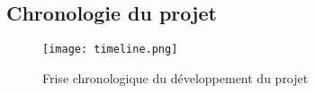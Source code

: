 \subsection{Chronologie du projet}
\begin{figure}[hbt!]
    \centering
    \texttt{[image: timeline.png]}
    \caption{Frise chronologique du développement du projet}

\end{figure}
\FloatBarrier